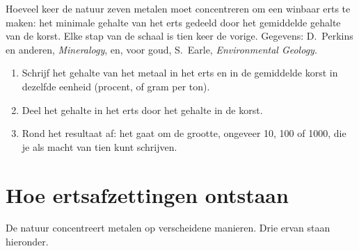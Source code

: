 \begin{omfigure}

{\small Hoeveel keer de natuur zeven metalen moet concentreren om een
winbaar erts te maken: het minimale gehalte van het erts gedeeld door het
gemiddelde gehalte van de korst. Elke stap van de schaal is tien keer de
vorige. Gegevens: D.~Perkins en anderen, \emph{Mineralogy}, en, voor goud,
S.~Earle, \emph{Environmental Geology}.}
\label{fig:g9:earth-resources:factors}
\end{omfigure}

\begin{method}
\begin{enumerate}
  \item Schrijf het gehalte van het metaal in het erts en in de gemiddelde
        korst in dezelfde eenheid (procent, of gram per ton).
  \item Deel het gehalte in het erts door het gehalte in de korst.
  \item Rond het resultaat af: het gaat om de grootte, ongeveer 10, 100 of
        1000, die je als macht van tien kunt schrijven.
\end{enumerate}
\end{method}


\section{Hoe ertsafzettingen ontstaan}

De natuur concentreert metalen op verscheidene manieren. Drie ervan staan hieronder.

